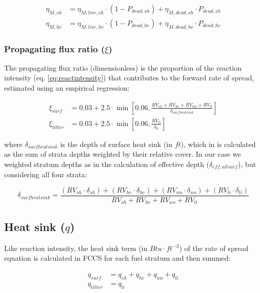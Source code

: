 \documentclass[]{book}
\begin{document}
\begin{eqnarray}
\eta_{M, sh} &= \eta_{M, live, sh} \cdot (1 - P_{dead, sh})+ \eta_{M, dead, sh} \cdot P_{dead, sh}\\
\eta_{M, he} &= \eta_{M, live, he} \cdot (1 - P_{dead, he})+ \eta_{M, dead, he} \cdot P_{dead, he}
\end{eqnarray}

\subsubsection{\texorpdfstring{Propagating flux ratio
(\(\xi\))}{Propagating flux ratio (\textbackslash{}xi)}}\label{propagating-flux-ratio-xi}

The propagating flux ratio (dimensionless) is the proportion of the
reaction intensity (eq. \eqref{eq:reactintensity}) that contributes to the
forward rate of spread, estimated using an empirical regression:

\begin{eqnarray}
\xi_{surf} &= 0.03 + 2.5 \cdot \min \left[0.06, \frac{RV_{sh}+RV_{he}+RV_{wo}+RV_{li}}{\delta_{surfheatsink}} \right]\\
\xi_{litter} &= 0.03 + 2.5 \cdot \min \left[0.06, \frac{RV_{li}}{\delta_{li}} \right]
\end{eqnarray}

where \(\delta_{surfheatsink}\) is the depth of surface heat sink (in
\(ft\)), which in \citet{Prichard2013} is calculated as the sum of
strata depths weighted by their relative cover. In our case we weighted
stratum depths as in the calculation of effective depth
(\(\delta_{eff, allsurf}\)), but considering all four strata:

\begin{equation}
\delta_{surfheatsink} = \frac{(RV_{sh}\cdot \delta_{sh}) +(RV_{he}\cdot \delta_{he}) + (RV_{wo}\cdot \delta_{wo})+ (RV_{li}\cdot \delta_{li})}{RV_{sh} +RV_{he}+RV_{wo}+RV_{li}}
\end{equation}

\subsection{\texorpdfstring{Heat sink
(\(q\))}{Heat sink (q)}}\label{heat-sink-q}

Like reaction intensity, the heat sink term (in \(Btu \cdot ft^{-3}\))
of the rate of spread equation is calculated in FCCS for each fuel
stratum and then summed:

\begin{eqnarray}
q_{surf} &= q_{sh}+q_{he}+q_{wo}+q_{li}\\
q_{litter} &= q_{li}
\label{eq:heatsink}
\end{eqnarray}
\end{document}
